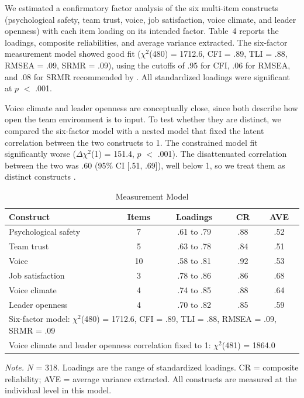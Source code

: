 \documentclass[11pt]{article}
\begin{document}
We estimated a confirmatory factor analysis of the six multi-item constructs (psychological safety, team trust, voice, job satisfaction, voice climate, and leader openness) with each item loading on its intended factor. Table~4 reports the loadings, composite reliabilities, and average variance extracted. The six-factor measurement model showed good fit ($\chi^2$(480) = 1712.6, CFI = .89, TLI = .88, RMSEA = .09, SRMR = .09), using the cutoffs of .95 for CFI, .06 for RMSEA, and .08 for SRMR recommended by \citet{hu1999}. All standardized loadings were significant at $p$ $<$ .001.

Voice climate and leader openness are conceptually close, since both describe how open the team environment is to input. To test whether they are distinct, we compared the six-factor model with a nested model that fixed the latent correlation between the two constructs to 1. The constrained model fit significantly worse ($\Delta\chi^2$(1) = 151.4, $p$ $<$ .001). The disattenuated correlation between the two was .60 (95\% CI [.51, .69]), well below 1, so we treat them as distinct constructs \citep{ronkko2022}.

\begin{table}[ht]
\centering
\begin{threeparttable}
\caption{Measurement Model}
\small
\begin{tabular}{lcccc}
\toprule
Construct & Items & Loadings & CR & AVE \\
\midrule
Psychological safety & 7 & .61 to .79 & .88 & .52 \\
Team trust & 5 & .63 to .78 & .84 & .51 \\
Voice & 10 & .58 to .81 & .92 & .53 \\
Job satisfaction & 3 & .78 to .86 & .86 & .68 \\
Voice climate & 4 & .74 to .85 & .88 & .64 \\
Leader openness & 4 & .70 to .82 & .85 & .59 \\
\midrule
\multicolumn{5}{l}{Six-factor model: $\chi^2$(480) = 1712.6, CFI = .89, TLI = .88, RMSEA = .09, SRMR = .09} \\
\multicolumn{5}{l}{Voice climate and leader openness correlation fixed to 1: $\chi^2$(481) = 1864.0} \\
\bottomrule
\end{tabular}
\begin{tablenotes}\footnotesize
\item \textit{Note.} $N$ = 318. Loadings are the range of standardized loadings. CR = composite reliability; AVE = average variance extracted. All constructs are measured at the individual level in this model.
\end{tablenotes}
\end{threeparttable}
\end{table}
\end{document}
